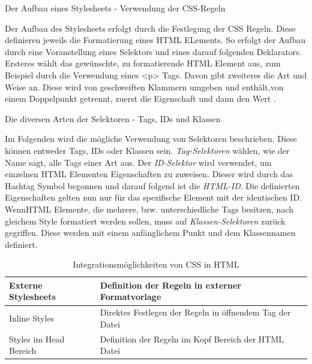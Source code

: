 \begin{description}
	\item[Der Aufbau eines Stylesheets - Verwendung der \ac{CSS}-Regeln]
    \hfill
    \label{des:Aufbau_CSS}
\end{description}
%
Der Aufbau des Stylesheets erfolgt durch die Festlegung der \ac{CSS} Regeln. Diese definieren jeweils die Formatierung eines \ac{HTML} ELements. So erfolgt der Aufbau durch eine Voranstellung eines Selektors und eines darauf folgenden Deklarators. Ersteres wählt das gewünschte, zu formatierende \ac{HTML} Element aus, zum Beispiel durch die Verwendung eines <p> Tags. Davon gibt zweiteres die Art und Weise an. Diese wird von geschweiften Klammern umgeben und enthält,von einem Doppelpunkt getrennt, zuerst die Eigenschaft und dann den Wert \cite{css-lernen}.

\newpage
\begin{description}
	\item[Die diversen Arten der Selektoren - Tags, IDs und Klassen]
    \hfill
	\label{des:Selektoren_CSS}
\end{description}
%
Im Folgenden wird die mögliche Verwendung von Selektoren beschrieben. Diese können entweder Tags, IDs oder Klassen sein. \textit{Tag-Selektoren} wählen, wie der Name sagt, alle Tags einer Art aus. Der \textit{ID-Selektor} wird verwendet, um einzelnen \ac{HTML} Elementen Eigenschaften zu zuweisen. Dieser wird durch das Hashtag Symbol begonnen und darauf folgend ist die \textit{HTML-ID}. Die definierten Eigenschaften gelten nun nur für das spezifische Element mit der identischen ID. 
Wenn\ac{HTML} Elemente, die mehrere, bzw. unterschiedliche Tags besitzen, nach gleichem Style formatiert werden sollen, muss auf \textit{Klassen-Selektoren} zurück gegriffen. Diese werden mit einem anfänglichem Punkt und dem Klassennamen definiert. 

\begin{table}
  \centering
  \begin{tabular}{|l|l|} \hline
  Externe Stylesheets    & Definition der Regeln in externer Formatvorlage          \\ \hline
  Inline Styles          & Direktes Festlegen der Regeln in öffnendem Tag der Datei \\ \hline
  Styles im Head Bereich & Definition der Regeln im Kopf Bereich der \ac{HTML} Datei \\ \hline
  \end{tabular}
  \label{tab:Integrationsmöglichkeiten}
  \caption{Integrationsmöglichkeiten von \ac{CSS} in \ac{HTML}}
\end{table}

